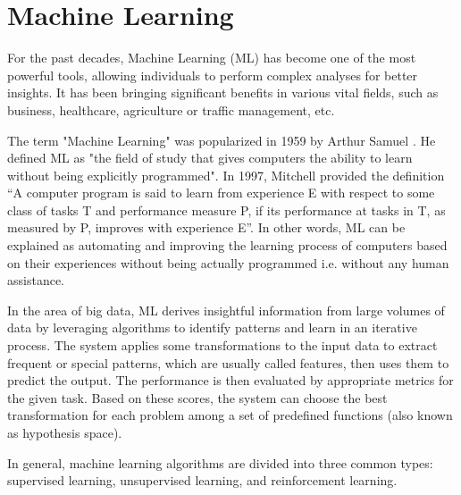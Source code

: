 \section{Machine Learning}
\label{sec:ml}

For the past decades, Machine Learning (ML) has become one of the most powerful tools, allowing individuals to perform complex analyses for better insights. It has been bringing significant benefits in various vital fields, such as business, healthcare, agriculture or traffic management, etc.

The term "Machine Learning" was popularized in 1959 by Arthur Samuel \cite{samuel2000gameofcheckers}. He defined ML as "the field of study that gives computers the ability to learn without being explicitly programmed". In 1997, Mitchell \cite{mitchell1997machine} provided the definition “A computer program is said to learn from experience E with respect to some class of tasks T and performance measure P, if its performance at tasks in T, as measured by P, improves with experience E”. In other words, ML can be explained as automating and improving the learning process of computers based on their experiences without being actually programmed i.e. without any human assistance.

In the area of big data, ML derives insightful information from large volumes of data by leveraging algorithms to identify patterns and learn in an iterative process. The system applies some transformations to the input data to extract frequent or special patterns, which are usually called features, then uses them to predict the output. The performance is then evaluated by appropriate metrics for the given task. Based on these scores, the system can choose the best transformation for each problem among a set of predefined functions (also known as hypothesis space). 

In general, machine learning algorithms are divided into three common types: supervised learning, unsupervised learning, and reinforcement learning. 


